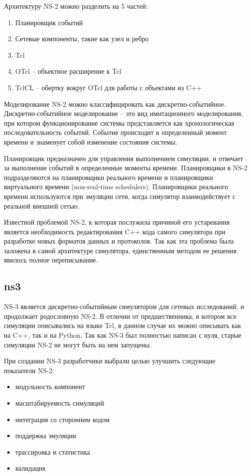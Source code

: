Архитектуру NS-2 можно разделить на 5 частей:
\begin{enumerate}
    \item Планировщик событий
    \item Сетевые компоненты, такие как узел и ребро
    \item Tcl
    \item OTcl -- объектное расширение к Tcl
    \item TclCL -- обертку вокруг OTcl для работы с объектами из C++
\end{enumerate}

Моделирование NS-2 можно классифицировать как дискретно-событийное.
Дискретно-событийное моделирование -- это вид имитационного моделирования, при 
котором функционирование системы представляется как хронологическая последовательность 
событий. Событие происходит в определенный момент времени и знаменует собой изменение 
состояния системы.

Планировщик предназначен для управления выполнением симуляции, и отвечает за выполнение
событий в определенные моменты времени.
Планировщики в NS-2 подразделяются на планировщики реального времени и
планировщики виртуального времени (non-real-time schedulers). Планировщики реального
времени используются при эмуляции сети, когда симулятор взаимодействует с реальной
внешней сетью.

Известной проблемой NS-2, к которая послужила причиной его устаревания является
необходимость редактирования C++ кода самого симулятора при разработке новых форматов
данных и протоколов. Так как эта проблема была заложена в самой архитектуре симулятора, 
единственным методом ее решения явилось полное переписывание.

\subsection{ns3}

NS-3 является дискретно-событийным симулятором для сетевых исследований,
и продолжает родословную NS-2. В отличии от предшественника, в котором все симуляции
описывались на языке Tcl, в данном случае их можно описывать как на C++, так и на Python.
Так как NS-3 был полностью написан с нуля, старые симуляции NS-2 не могут быть на нем
запущены.


При создании NS-3 разработчики выбрали целью улучшить следующие показатели NS-2:
\begin{itemize}
    \item модульность компонент
    \item масштабируемость симуляций
    \item интеграция со сторонним кодом
    \item поддержка эмуляции
    \item трассировка и статистика
    \item валидация
\end{itemize}

